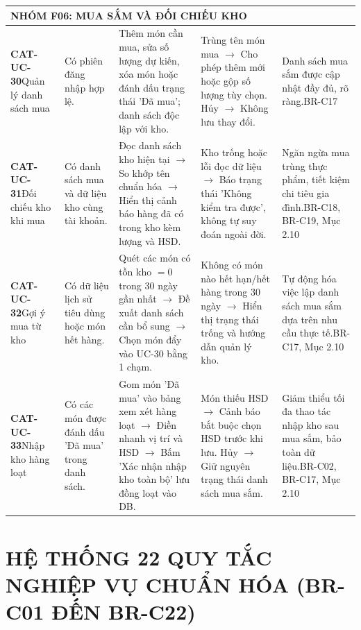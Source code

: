 \documentclass[10pt,a4paper]{article}
\begin{document}
\begin{longtable}{|p{2.1cm}|p{2.3cm}|p{3.5cm}|p{3.8cm}|p{3.0cm}|}
\multicolumn{5}{|l|}{\textbf{\color{primary}NHÓM F06: MUA SẮM VÀ ĐỐI CHIẾU KHO}} \\
\hline
\textbf{CAT-UC-30}\newline Quản lý danh sách mua & Có phiên đăng nhập hợp lệ. & Thêm món cần mua, sửa số lượng dự kiến, xóa món hoặc đánh dấu trạng thái 'Đã mua'; danh sách độc lập với kho. & Trùng tên món mua $\to$ Cho phép thêm mới hoặc gộp số lượng tùy chọn. Hủy $\to$ Không lưu thay đổi. & Danh sách mua sắm được cập nhật đầy đủ, rõ ràng.\newline BR-C17 \\
\hline
\textbf{CAT-UC-31}\newline Đối chiếu kho khi mua & Có danh sách mua và dữ liệu kho cùng tài khoản. & Đọc danh sách kho hiện tại $\to$ So khớp tên chuẩn hóa $\to$ Hiển thị cảnh báo hàng đã có trong kho kèm lượng và HSD. & Kho trống hoặc lỗi đọc dữ liệu $\to$ Báo trạng thái 'Không kiểm tra được', không tự suy đoán ngoài đời. & Ngăn ngừa mua trùng thực phẩm, tiết kiệm chi tiêu gia đình.\newline BR-C18, BR-C19, Mục 2.10 \\
\hline
\textbf{CAT-UC-32}\newline Gợi ý mua từ kho & Có dữ liệu lịch sử tiêu dùng hoặc món hết hàng. & Quét các món có tồn kho $=0$ trong 30 ngày gần nhất $\to$ Đề xuất danh sách cần bổ sung $\to$ Chọn món đẩy vào UC-30 bằng 1 chạm. & Không có món nào hết hạn/hết hàng trong 30 ngày $\to$ Hiển thị trạng thái trống và hướng dẫn quản lý kho. & Tự động hóa việc lập danh sách mua sắm dựa trên nhu cầu thực tế.\newline BR-C17, Mục 2.10 \\
\hline
\textbf{CAT-UC-33}\newline Nhập kho hàng loạt & Có các món được đánh dấu 'Đã mua' trong danh sách. & Gom món 'Đã mua' vào bảng xem xét hàng loạt $\to$ Điền nhanh vị trí và HSD $\to$ Bấm 'Xác nhận nhập kho toàn bộ' lưu đồng loạt vào DB. & Món thiếu HSD $\to$ Cảnh báo bắt buộc chọn HSD trước khi lưu. Hủy $\to$ Giữ nguyên trạng thái danh sách mua sắm. & Giảm thiểu tối đa thao tác nhập kho sau mua sắm, bảo toàn dữ liệu.\newline BR-C02, BR-C17, Mục 2.10 \\
\hline
\end{longtable}
\endgroup

\newpage
\section{HỆ THỐNG 22 QUY TẮC NGHIỆP VỤ CHUẨN HÓA (BR-C01 ĐẾN BR-C22)}
\end{document}
